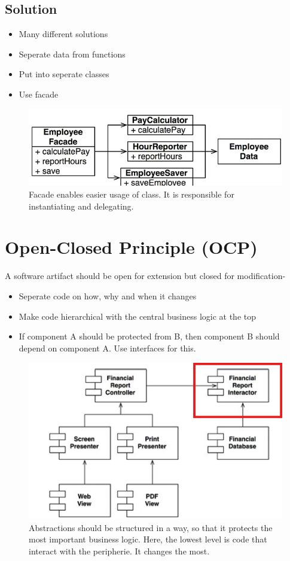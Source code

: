 \documentclass[../Main.tex]{subfiles}
\begin{document}
\subsection{Solution}
\begin{itemize}
    \item Many different solutions
    \item Seperate data from functions
    \item Put into seperate classes
    \item Use facade
\end{itemize}

\begin{figure}[H]
    \centering
    \includegraphics[width=0.75\linewidth]{Images/cleanarch/employeefacade.png}
    \caption{Facade enables easier usage of class. It is responsible for instantiating and delegating.}
\end{figure}

\section{Open-Closed Principle (OCP)}
A software artifact should be open for extension but closed for modification-
\begin{itemize}
    \item Seperate code on how, why and when it changes
    \item Make code hierarchical with the central business logic at the top
    \item If component A should be protected from B, then component B should depend on component A. Use interfaces for this.
\end{itemize}

\begin{figure}[H]
    \centering
    \includegraphics[width=0.75\linewidth]{Images/cleanarch/ocp.png}
    \caption{Abstractions should be structured in a way, so that
        it protects the most important business logic. Here, the lowest
        level is code that interact with the peripherie. It changes the most.}
\end{figure}
\end{document}
